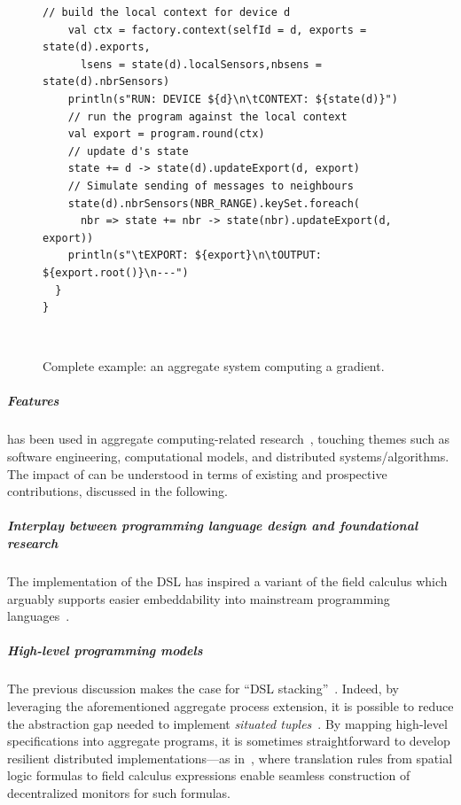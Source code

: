\begin{figure}
\begin{lrbox}{\exosystem}
\begin{lstlisting}[deletekeywords={[2]{nbr}},
emph={state}, basicstyle=\lst@ifdisplaystyle\footnotesize\fi\ttfamily]
    // build the local context for device d
    val ctx = factory.context(selfId = d, exports = state(d).exports,
      lsens = state(d).localSensors,nbsens = state(d).nbrSensors)
    println(s"RUN: DEVICE ${d}\n\tCONTEXT: ${state(d)}")
    // run the program against the local context
    val export = program.round(ctx)
    // update d's state
    state += d -> state(d).updateExport(d, export)
    // Simulate sending of messages to neighbours
    state(d).nbrSensors(NBR_RANGE).keySet.foreach(
      nbr => state += nbr -> state(nbr).updateExport(d, export))
    println(s"\tEXPORT: ${export}\n\tOUTPUT: ${export.root()}\n---")
  }
}
\end{lstlisting}
\end{lrbox}
\\
\caption{Complete example: an aggregate system computing a gradient.}
\label{fig:example-full}
\end{figure}
\subparagraph{Features}
\label{s:impact}
\scafi{}
 has been used 
 in aggregate computing-related research~\cite{DBLP:journals/eaai/CasadeiVAPD21,audrito2022ecoop-xc,DBLP:conf/coordination/AguzziCV22,
 DBLP:conf/fmec/CasadeiV19,DBLP:conf/IEEEscc/CasadeiTVD19,DBLP:journals/scp/CasadeiAV18,DBLP:journals/jsan/CasadeiAV21,DBLP:conf/coordination/CasadeiVRA21,casadei2022applsci,arxiv2020scafi-nc},
  touching themes such as 
  software engineering, 
  computational models, and
  distributed systems/algorithms.
%
The impact of \scafi{}
 can be understood in terms of 
 existing and prospective contributions, 
 discussed in the following.

\subparagraph*{Interplay between programming language design and foundational research} 
%
The implementation of the \scafi{} DSL
 has inspired a variant of the field calculus
 which arguably supports easier embeddability
 into mainstream programming languages~\cite{DBLP:conf/isola/CasadeiVAD20,arxiv2020scafi-nc}.

\subparagraph*{High-level programming models}
%
The previous discussion  
 makes the case for ``DSL stacking''~\cite{DBLP:conf/icsoft/HummE10}.
%
Indeed, by leveraging the aforementioned aggregate process extension, 
 it is possible to reduce the abstraction gap
 needed to implement \emph{situated tuples}~\cite{DBLP:conf/coordination/CasadeiVRA21}.
%
By mapping high-level specifications into aggregate programs, it is sometimes straightforward to develop resilient distributed implementations---as in~\cite{DBLP:journals/jss/AudritoCDSV21},
 where translation rules from 
 spatial logic formulas
 to field calculus expressions
 enable seamless construction of decentralized monitors for such formulas.

